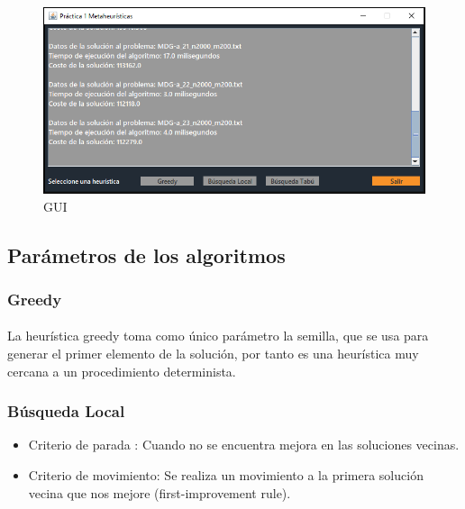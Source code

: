 \documentclass{article}
\begin{document}
		\begin{figure}[H]
		
			\centering
			\includegraphics[scale=0.4]{img/GUI}
			\caption{GUI}
		
		\end{figure}
	
	\subsection{Parámetros de los algoritmos}
	
		\subsubsection{Greedy}
		
				\paragraph{}La heurística greedy toma como único parámetro la semilla, que se usa para generar el primer elemento de la solución, por tanto es una heurística muy cercana a un procedimiento determinista.
	
		\subsubsection{Búsqueda Local}
		
			\begin{itemize}
				
				\item Criterio de parada : Cuando no se encuentra mejora en las soluciones vecinas.
				
				\item Criterio de movimiento: Se realiza un movimiento a la primera solución vecina que nos mejore (first-improvement rule).
				
			\end{itemize}
				
\end{document}
